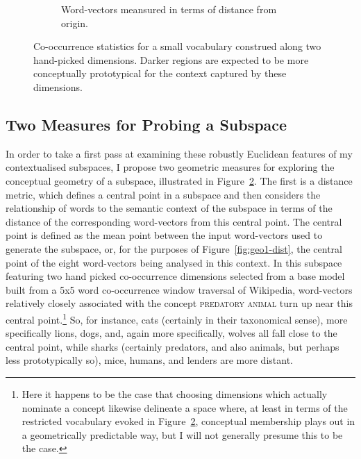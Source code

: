 \begin{figure}
\begin{subfigure}[]{0.45\textwidth}
  \caption{Word-vectors meansured in terms of distance from origin.}\label{fig:geo1-norm}
  \end{subfigure}
  \caption{Co-occurrence statistics for a small vocabulary construed along two hand-picked dimensions.  Darker regions are expected to be more conceptually prototypical for the context captured by these dimensions.}\label{fig:geo1}
\end{figure}

\subsection{Two Measures for Probing a Subspace} \label{sec:twomeasures}

In order to take a first pass at examining these robustly Euclidean features of my contextualised subspaces, I propose two geometric measures for exploring the conceptual geometry of a subspace, illustrated in Figure~\ref{fig:geo1}.  The first is a distance metric, which defines a central point in a subspace and then considers the relationship of words to the semantic context of the subspace in terms of the distance of the corresponding word-vectors from this central point.  The central point is defined as the mean point between the input word-vectors used to generate the subspace, or, for the purposes of Figure~\ref{fig:geo1-dist}, the central point of the eight word-vectors being analysed in this context.  In this subspace featuring two hand picked co-occurrence dimensions selected from a base model built from a 5x5 word co-occurrence window traversal of Wikipedia, word-vectors relatively closely associated with the concept \textsc{predatory animal} turn up near this central point.\footnote{Here it happens to be the case that choosing dimensions which actually nominate a concept likewise delineate a space where, at least in terms of the restricted vocabulary evoked in Figure~\ref{fig:geo1}, conceptual membership plays out in a geometrically predictable way, but I will not generally presume this to be the case.}  So, for instance, cats (certainly in their taxonomical sense), more specifically lions, dogs, and, again more specifically, wolves all fall close to the central point, while sharks (certainly predators, and also animals, but perhaps less prototypically so), mice, humans, and lenders are more distant.


